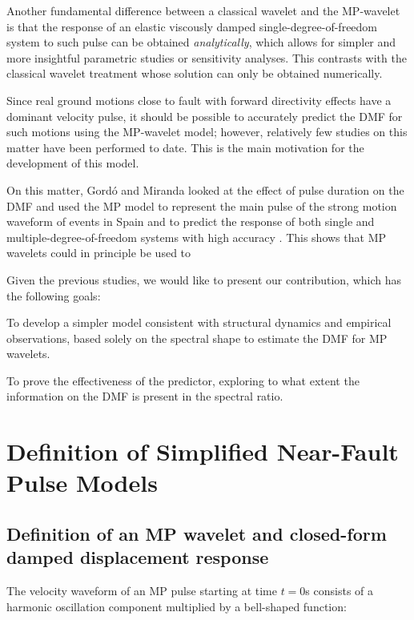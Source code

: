 Another fundamental difference between a classical wavelet and the
MP-wavelet is that the response of an elastic viscously damped
single-degree-of-freedom system to such pulse can be obtained
\emph{analytically}, which allows for
simpler and more insightful parametric studies or sensitivity analyses.
This contrasts with the classical wavelet treatment whose solution can
only be obtained numerically.

Since real ground motions close to fault with forward directivity
effects have a dominant velocity pulse, it should be possible to
accurately predict the DMF for such motions using the MP-wavelet model;
however, relatively few studies on this matter have been performed to
date. This is the main motivation for the development of this model.

On this matter, Gordó and Miranda 
looked at the effect of pulse duration on the DMF and used the MP model
to represent the main pulse of the strong motion waveform of events in
Spain and to predict the response of both single and
multiple-degree-of-freedom systems with high accuracy
. This shows that MP wavelets could
in principle be used to

Given the previous studies, we would like to present our contribution,
which has the following goals:

To develop a simpler model consistent with structural dynamics and
empirical observations, based solely on the spectral shape to estimate
the DMF for MP wavelets.

To prove the effectiveness of the predictor, exploring to what extent
the information on the DMF is present in the spectral ratio.

\section{Definition of Simplified Near-Fault Pulse
Models}\label{definition-of-simplified-near-fault-pulse-models}

\subsection{Definition of an MP wavelet and closed-form damped
displacement
response}\label{definition-of-an-mp-wavelet-and-closed-form-damped-displacement-response}

The velocity waveform of an MP pulse starting at time \(t = 0\)s
consists of a harmonic oscillation component multiplied by a bell-shaped
function:

